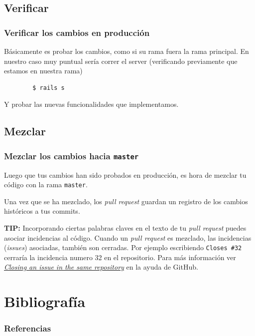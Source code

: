 \documentclass[10pt]{beamer}
\begin{document}
\subsection{Verificar}
\begin{frame}[fragile]
	\frametitle{Verificar los cambios en producción}

	Básicamente es probar los cambios, como si su rama fuera la rama principal.  
	En nuestro caso muy puntual sería correr el server (verificando previamente 
	que estamos en nuestra rama)

	\begin{lstlisting}
		$ rails s
	\end{lstlisting}

	Y probar las nuevas funcionalidades que implementamos.
\end{frame}

\subsection{Mezclar}
\begin{frame}[fragile]
	\frametitle{Mezclar los cambios hacia \texttt{master}}
	Luego que tus cambios han sido probados en producción, es hora de mezclar 
	tu código con la rama \texttt{master}.

	Una vez que se ha mezclado, los \textit{pull request} guardan un registro 
	de los cambios históricos a tus commits.

	\textbf{TIP:} Incorporando ciertas palabras claves en el texto de tu 
	\textit{pull request} puedes asociar incidencias al código. Cuando un 
	\textit{pull request} es mezclado, las incidencias (\textit{issues}) 
	asociadas, también son cerradas. Por ejemplo escribiendo \texttt{Closes 
		\#32} cerraría la incidencia numero 32 en el repositorio.  Para más 
	información ver 
	\href{https://help.github.com/articles/closing-issues-via-commit-messages/}{\em 
		Closing an issue in the same repository} en la ayuda de GitHub.
\end{frame}


\section{Bibliografía}
\begin{frame}
	\frametitle{Referencias}

	\printbibliography[heading=none]
	\nocite{*}
\end{frame}
\end{document}
